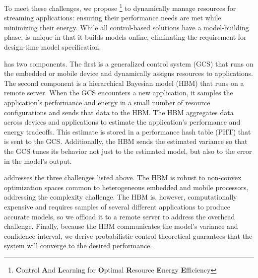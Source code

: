 To meet these challenges, we propose
\SYSTEM{}\footnote{\textbf{C}ontrol \textbf{A}nd \textbf{L}earning for
  \textbf{O}ptimal \textbf{R}esource \textbf{E}nergy
  \textbf{E}fficiency} to dynamically manage resources for streaming
applications: ensuring their performance needs are met while
minimizing their energy.  While all control-based solutions have a
model-building phase, \SYSTEM{} is unique in that it builds models
online, eliminating the requirement for design-time model
specification.

\SYSTEM{} has two components.  The first is a generalized control
system (GCS) that runs on the embedded or mobile device and
dynamically assigns resources to applications.  The second component
is a hierarchical Bayes\-ian model (HBM) that runs on a remote server.
When the GCS encounters a new application, it samples the
application's performance and energy in a small number of resource
configurations and sends that data to the HBM.  The HBM aggregates
data across devices and applications to estimate the application's
performance and energy tradeoffs.  This estimate is stored in a
performance hash table (PHT) that is sent to the GCS.  Additionally,
the HBM sends the estimated variance so that the GCS tunes its
behavior not just to the estimated model, but also to the error in the
model's output.

\SYSTEM{} addresses the three challenges listed above.  The HBM is
robust to non-convex optimization spaces common to heterogeneous
embedded and mobile processors, addressing the complexity challenge.
The HBM is, however, computationally expensive and requires samples of
several different applications to produce accurate models, so we
offload it to a remote server to address the overhead challenge.
Finally, because the HBM communicates the model's variance and
confidence interval, we derive probabilistic control theoretical
guarantees that the system will converge to the desired performance.

